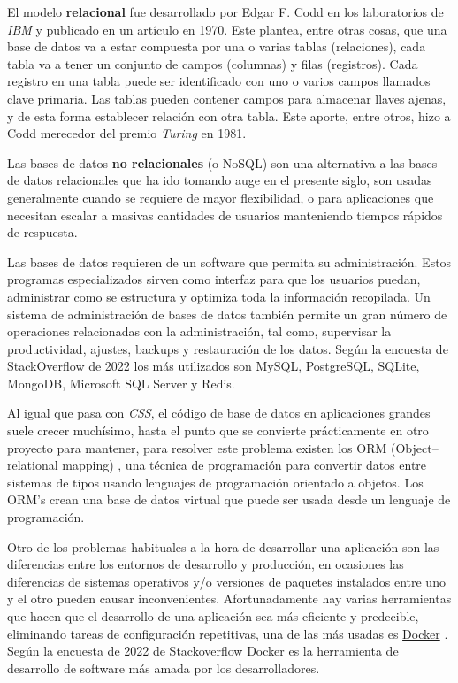 El modelo \textbf{relacional} \cite{bd_relational} fue desarrollado por Edgar F. Codd en los laboratorios de \textit{IBM} y publicado en un artículo \cite{bd_relational} en 1970. Este plantea, entre otras cosas, que una base de datos va a estar compuesta por una o varias tablas (relaciones), cada tabla va a tener un conjunto de campos (columnas) y filas (registros). Cada registro en una tabla puede ser identificado con uno o varios campos llamados clave primaria. Las tablas pueden contener campos para almacenar llaves ajenas, y de esta forma establecer relación con otra tabla. Este aporte, entre otros, hizo a Codd merecedor del premio \textit{Turing} \cite{codd_turing} en 1981.
\newline

Las bases de datos \textbf{no relacionales} (o NoSQL) \cite{nosql} son una alternativa a las bases de datos relacionales que ha ido tomando auge en el presente siglo, son usadas generalmente cuando se requiere de mayor flexibilidad, o para aplicaciones que necesitan escalar a masivas cantidades de usuarios manteniendo tiempos rápidos de respuesta.
\newline

Las bases de datos requieren de un software que permita su administración. Estos programas especializados sirven como interfaz para que los usuarios puedan, administrar como se estructura y optimiza toda la información recopilada. Un sistema de administración de bases de datos también permite un gran número de operaciones relacionadas con la administración, tal como, supervisar la productividad, ajustes, backups y restauración de los datos. Según la encuesta de StackOverflow de 2022 \cite{encuesta2022} los más utilizados son MySQL, PostgreSQL, SQLite, MongoDB, Microsoft SQL Server y Redis.
\newline


Al igual que pasa con \textit{CSS}, el código de base de datos en aplicaciones grandes suele crecer muchísimo, hasta el punto que se convierte prácticamente en otro proyecto para mantener, para resolver este problema existen los ORM (Object–relational mapping) \cite{orm}, una técnica de programación para convertir datos entre sistemas de tipos usando lenguajes de programación orientado a objetos. Los ORM's crean una base de datos virtual que puede ser usada desde un lenguaje de programación.
\newline

Otro de los problemas habituales a la hora de desarrollar una aplicación son las diferencias entre los entornos de desarrollo y producción, en ocasiones las diferencias de sistemas operativos y/o versiones de paquetes instalados entre uno y el otro pueden causar inconvenientes. Afortunadamente hay varias herramientas que hacen que el desarrollo de una aplicación sea más eficiente y predecible, eliminando tareas de configuración repetitivas, una de las más usadas es \href{docker.com}{Docker} \cite{docker_docs}. Según la encuesta de 2022 de Stackoverflow \cite{encuesta2022} Docker es la herramienta de desarrollo de software más amada por los desarrolladores.






